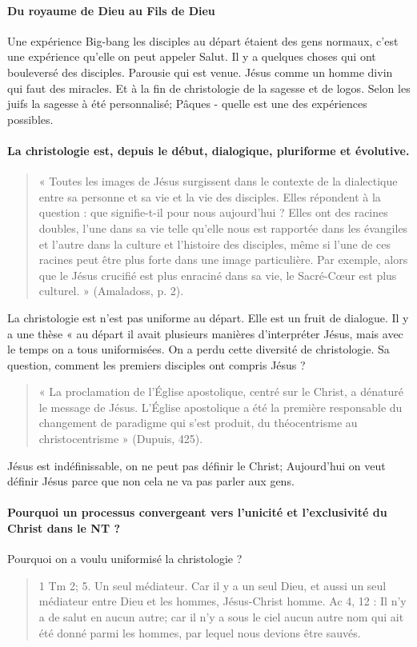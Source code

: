 \paragraph{Du royaume de Dieu au Fils de Dieu} 
	{Une expérience Big-bang} les disciples au départ étaient des gens normaux, c’est une expérience qu’elle on peut appeler Salut. Il y a quelques choses qui ont bouleversé des disciples.
	Parousie qui est venue. Jésus comme un homme divin qui faut des miracles. Et à la fin de christologie de la sagesse et de logos. Selon les juifs la sagesse à été personnalisé; Pâques - quelle est une des expériences possibles.
	
\paragraph{La christologie est, depuis le début, dialogique, pluriforme et évolutive. }

\begin{quote}
    « Toutes les images de Jésus surgissent dans le contexte de la dialectique entre sa personne et sa vie et la vie des disciples. Elles répondent à la question : que signifie-t-il pour nous aujourd'hui ? Elles ont des racines doubles, l'une dans sa vie telle qu'elle nous est rapportée dans les évangiles et l'autre dans la culture et l'histoire des disciples, même si l'une de ces racines peut être plus forte dans une image particulière. Par exemple, alors que le Jésus crucifié est plus enraciné dans sa vie, le Sacré-Cœur est plus culturel. » (Amaladoss, p. 2). 
\end{quote}
	La christologie est n’est pas uniforme au départ. Elle est un fruit de dialogue. Il y a une thèse «  au départ il avait plusieurs manières d’interpréter Jésus, mais avec le temps on a tous uniformisées. On a perdu cette diversité de christologie. Sa question, comment les premiers disciples ont compris Jésus ? 
	\begin{quote}
	    « La proclamation de l’Église apostolique, centré sur le Christ, a dénaturé le message de Jésus. L’Église apostolique a été la première responsable du changement de paradigme qui s’est produit, du théocentrisme au christocentrisme » (Dupuis, 425). 
	\end{quote}
	Jésus est indéfinissable, on ne peut pas définir le Christ; Aujourd'hui on veut définir Jésus parce que non cela ne va pas parler aux gens.

\paragraph{Pourquoi un processus convergeant vers l’unicité et l’exclusivité du Christ dans le NT ? } {	Pourquoi on a voulu uniformisé la christologie ?}
\begin{quote}
    1 Tm 2; 5. Un seul médiateur. Car il y a un seul Dieu, et aussi un seul médiateur entre Dieu et les hommes, Jésus-Christ homme.
	Ac 4, 12 : Il n'y a de salut en aucun autre; car il n'y a sous le ciel aucun autre nom qui ait été donné parmi les hommes, par lequel nous devions être sauvés.
\end{quote}

